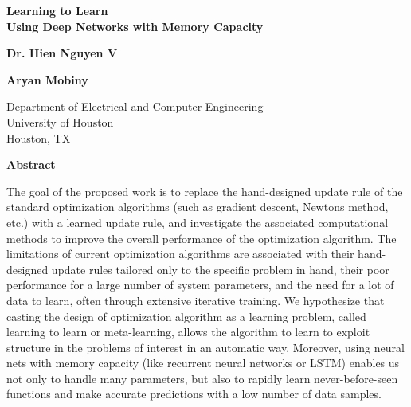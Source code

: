 \documentclass[a4paper, 11pt]{article}
\begin{document}
\begin{titlepage}
\begin{center}
\vspace*{1cm}
\textbf{\Huge{Learning to Learn}}\\
\vspace{0.5cm}
\textbf{\Large{Using Deep Networks with Memory Capacity}}
       
\vspace{2cm}
\textbf{Dr. Hien Nguyen V}
        
\textbf{Aryan Mobiny}
        
\vspace{1cm}        
Department of Electrical and Computer Engineering\\
University of Houston\\
Houston, TX

\vspace{5cm}
\textbf{Abstract}
\end{center}
        
The goal of the proposed work is to replace the hand-designed update rule of the standard optimization algorithms (such as gradient descent, Newton\textsc{}s method, etc.) with a learned update rule, and investigate the associated computational methods to improve the overall performance of the optimization algorithm. The limitations of current optimization algorithms are associated with their hand-designed update rules tailored only to the specific problem in hand, their poor performance for a large number of system parameters, and the need for a lot of data to learn, often through extensive iterative training. We hypothesize that casting the design of optimization algorithm as a learning problem, called learning to learn or meta-learning, allows the algorithm to learn to exploit structure in the problems of interest in an automatic way. Moreover, using neural nets with memory capacity (like recurrent neural networks or LSTM) enables us not only to handle many parameters, but also to rapidly learn never-before-seen functions and make accurate predictions with a low number of data samples.      

        
\end{titlepage}
\end{document}

